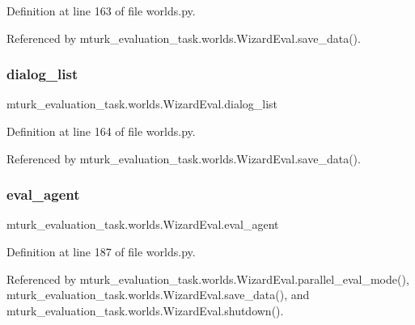 Definition at line 163 of file worlds.\+py.



Referenced by mturk\+\_\+evaluation\+\_\+task.\+worlds.\+Wizard\+Eval.\+save\+\_\+data().

\mbox{\label{classmturk__evaluation__task_1_1worlds_1_1WizardEval_a79287ba53709562c48e0a123cdca1a45}} 
\subsubsection{\texorpdfstring{dialog\+\_\+list}{dialog\_list}}
{\footnotesize\ttfamily mturk\+\_\+evaluation\+\_\+task.\+worlds.\+Wizard\+Eval.\+dialog\+\_\+list}



Definition at line 164 of file worlds.\+py.



Referenced by mturk\+\_\+evaluation\+\_\+task.\+worlds.\+Wizard\+Eval.\+save\+\_\+data().

\mbox{\label{classmturk__evaluation__task_1_1worlds_1_1WizardEval_a3d6abd4df1554f895e89d7398a042bc2}} 
\subsubsection{\texorpdfstring{eval\+\_\+agent}{eval\_agent}}
{\footnotesize\ttfamily mturk\+\_\+evaluation\+\_\+task.\+worlds.\+Wizard\+Eval.\+eval\+\_\+agent}



Definition at line 187 of file worlds.\+py.



Referenced by mturk\+\_\+evaluation\+\_\+task.\+worlds.\+Wizard\+Eval.\+parallel\+\_\+eval\+\_\+mode(), mturk\+\_\+evaluation\+\_\+task.\+worlds.\+Wizard\+Eval.\+save\+\_\+data(), and mturk\+\_\+evaluation\+\_\+task.\+worlds.\+Wizard\+Eval.\+shutdown().

